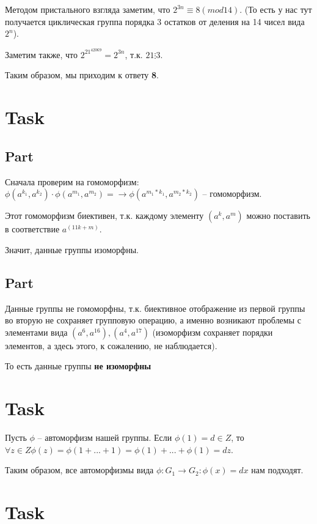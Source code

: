 \documentclass[12pt, a4paper]{article}
\theoremstyle{definition}
\begin{document}
    Методом пристального взгляда заметим, что $2^{3n} \equiv 8 (mod 14)$. (То есть у нас тут получается циклическая группа порядка 3 остатков от деления на 14 чисел вида $2^n$).

    Заметим также, что $2^{21^{42069}} = 2^{3n}$, т.к. $21 \vdots 3$.
    
    Таким образом, мы приходим к ответу \textbf{8}.

\section{Task}

    \subsection{Part}

        Сначала проверим на гомоморфизм: $\phi (a^{k_1}, a^{k_2}) \cdot \phi (a^{m_1}, a^{m_2}) =\rightarrow \phi (a^{m_1 * k_1}, a^{m_2 * k_2})$ -- гомоморфизм.

        Этот гомоморфизм биективен, т.к. каждому элементу $(a^k, a^m)$ можно поставить в соответствие $a^(11k + m)$.

        Значит, данные группы изоморфны.

    \subsection{Part}

        Данные группы не гомоморфны, т.к. биективное отображение из первой группы во вторую не сохраняет групповую операцию, а именно
        возникают проблемы с элементами вида $(a^6, a^16), (a^4, a^17)$ (изоморфизм сохраняет порядки элементов, а здесь этого, к сожалению, не наблюдается).

        То есть данные группы \textbf{не изоморфны}


\section{Task}

    Пусть $\phi$ -- автоморфизм нашей группы.
    Если $\phi (1) = d \in Z$, то $\forall z \in Z \phi (z) = \phi (1 + ... + 1) = \phi (1) + ... + \phi (1) = dz$.

    Таким образом, все автоморфизмы вида $\phi : G_1 \rightarrow G_2 : \phi (x) = dx$ нам подходят.

\section{Task}
\end{document}
